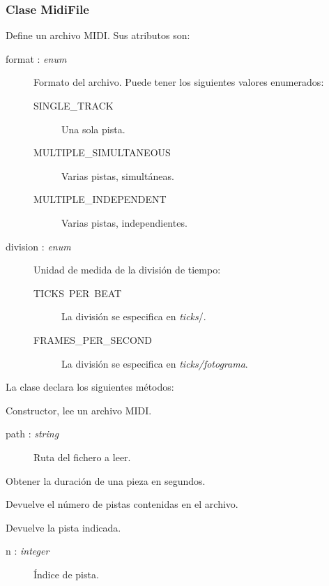 \smallskip

\subsubsection{Clase MidiFile}

Define un archivo \acrshort{MIDI}. Sus atributos son:

\begin{description}
	\item[format : \textit{enum}] Formato del archivo. Puede tener los siguientes valores enumerados:
	
	\begin{description}
		\item[SINGLE\_TRACK] Una sola pista.
		\item[MULTIPLE\_SIMULTANEOUS] Varias pistas, simultáneas.
		\item[MULTIPLE\_INDEPENDENT] Varias pistas, independientes.
	\end{description}
	
	\item[division : \textit{enum}] Unidad de medida de la división de tiempo:
	
	\begin{description}
		\item[TICKS\ PER\ BEAT] La división se especifica en \textit{ticks}/\quarternote.
		\item[FRAMES\_PER\_SECOND] La división se especifica en \textit{ticks/fotograma}.
	\end{description}

\end{description}

La clase declara los siguientes métodos:

\begin{description}[style=nextline]
	\item[MidiFile (path)] 
	Constructor, lee un archivo \acrshort{MIDI}. 
	
	\begin{description}
		\item[path : \textit{string}] Ruta del fichero a leer.
	\end{description}
	
	\item[duration () : \textit{float}] 
	Obtener la duración de una pieza en segundos.
	
	\item[length : \textit{integer}]
	Devuelve el número de pistas contenidas en el archivo.
	
	\item[get (n) : \textit{MidiFile}]
	Devuelve la pista indicada.
	
	\begin{description}
		\item[n : \textit{integer}] Índice de pista.
	\end{description}
\end{description}


